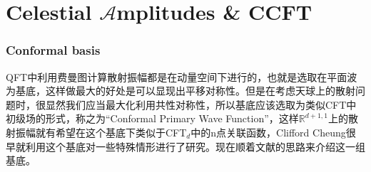 \part{Celestial $\mathcal{A}$mplitudes \& CCFT}\label{part8}
\setcounter{theorem}{0}
\setcounter{definition}{0}
\setcounter{lemma}{0}
\setcounter{sidenote}{1}
\section{Conformal basis}
QFT中利用费曼图计算散射振幅都是在动量空间下进行的，也就是选取在平面波为基底，这样做最大的好处是可以显现出平移对称性。但是在考虑天球上的散射问题时，很显然我们应当最大化利用共性对称性，所以基底应该选取为类似CFT中初级场的形式，称之为“Conformal Primary Wave Function”，这样$\mathbb{R}^{d+1,1}$上的散射振幅就有希望在这个基底下类似于CFT$_{d}$中的n点关联函数，Clifford Cheung很早就利用这个基底对一些特殊情形进行了研究\cite{Cheung:2016iub}。现在顺着文献\cite{Pasterski:2017kqt}的思路来介绍这一组基底。
